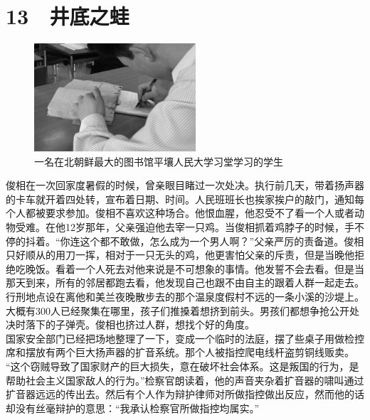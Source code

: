 \fancyhead[RO]{\thepage}
\fancyhead[LE]{\thepage}
\fancyfoot[LE,RO]{}
\fancyfoot[LO,CE]{}
\fancyfoot[CO,RE]{}
\chapter*{13 {\FA } 井底之蛙}
\begin{figure}[!htbp]
	\centering
	\includegraphics[width=6cm]{./Chapters/Images/13.jpg}
	\caption*{一名在北朝鲜最大的图书馆平壤人民大学习堂学习的学生}
\end{figure}


俊相在一次回家度暑假的时候，曾亲眼目睹过一次处决。执行前几天，带着扬声器的卡车就开着四处转，宣布着日期、时间。人民班班长也挨家挨户的敲门，通知每个人都被要求参加。俊相不喜欢这种场合。他恨血腥，他忍受不了看一个人或者动物受难。在他12岁那年，父亲强迫他去宰一只鸡。当俊相抓着鸡脖子的时候，手不停的抖着。“你连这个都不敢做，怎么成为一个男人啊？”父亲严厉的责备道。俊相只好顺从的用刀一挥，相对于一只无头的鸡，他更害怕父亲的斥责，但是当晚他拒绝吃晚饭。看着一个人死去对他来说是不可想象的事情。他发誓不会去看。但是当那天到来，所有的邻居都跑去看，他发现自己也跟不由自主的跟着人群一起走去。行刑地点设在离他和美兰夜晚散步去的那个温泉度假村不远的一条小溪的沙堤上。大概有300人已经聚集在哪里，孩子们推搡着想挤到前头。男孩们都想争抢公开处决时落下的子弹壳。俊相也挤过人群，想找个好的角度。\\

国家安全部门已经把场地整理了一下，变成一个临时的法庭，摆了些桌子用做检控席和摆放有两个巨大扬声器的扩音系统。那个人被指控爬电线杆盗剪铜线贩卖。\\

“这个窃贼导致了国家财产的巨大损失，意在破坏社会体系。这是叛国的行为，是帮助社会主义国家敌人的行为。”检察官朗读着，他的声音夹杂着扩音器的啸叫通过扩音器远远的传出去。然后有个人作为辩护律师对所做指控做出反应，然而他的话却没有丝毫辩护的意思：“我承认检察官所做指控均属实。”\\

